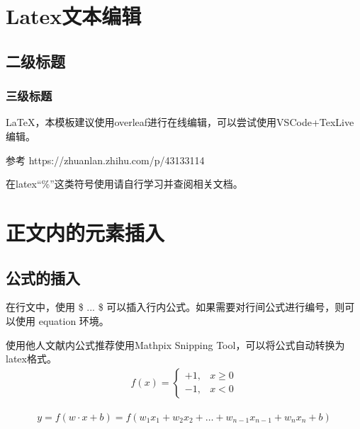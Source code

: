 \documentclass[a4paper,AutoFakeBold,oneside,12pt]{book}
\begin{document}
\blankmatter
  

\frontmatter\tableofcontents %


\newpage\mainmatter
{}


\chapter{Latex文本编辑}
\section{二级标题}
\subsection{三级标题}
\LaTeX，本模板建议使用overleaf进行在线编辑，可以尝试使用VSCode+TexLive编辑。

参考 https://zhuanlan.zhihu.com/p/43133114

在latex“\%”这类符号使用请自行学习并查阅相关文档。


\chapter{正文内的元素插入}
\section{公式的插入}
在行文中，使用 \$ ... \$ 可以插入行内公式。如果需要对行间公式进行编号，则可以使用 equation 环境。

使用他人文献内公式推荐使用Mathpix Snipping Tool，可以将公式自动转换为latex格式。
\begin{equation}
\begin{aligned}
f(x)=\left\{\begin{array}{ll}
+1, & x \geqslant 0 \\
-1, & x<0
\end{array}\right.
\end{aligned}
\end{equation}

\begin{equation}
\begin{aligned}
y=f(w \cdot x+b)=f\left(w_{1} x_{1}+w_{2} x_{2}+\dots+w_{n-1} x_{n-1}+w_{n} x_{n}+b\right)
\end{aligned}
\end{equation}
\end{document}
